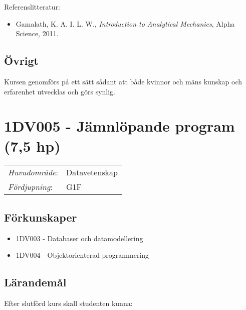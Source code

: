 Referenslitteratur:

\begin{itemize}
\tightlist
\item
  Gamalath, K. A. I. L. W., \emph{Introduction to Analytical Mechanics},
  Alpha Science, 2011.
\end{itemize}

\subsection*{Övrigt}

Kursen genomförs på ett sätt sådant att både kvinnor och mäns kunskap och erfarenhet utvecklas och görs synlig.
\pagebreak
\section*{1DV005 - Jämnlöpande program (7,5 hp)}

\begin{tabular}{ll}\emph{Huvudområde}: & Datavetenskap\tabularnewline\emph{Fördjupning}: & G1F\tabularnewline\end{tabular}

\subsection*{Förkunskaper}

\begin{itemize}
\tightlist
\item
  1DV003 - Databaser och datamodellering
\item
  1DV004 - Objektorienterad programmering
\end{itemize}

\subsection*{Lärandemål}

Efter slutförd kurs skall studenten kunna:

